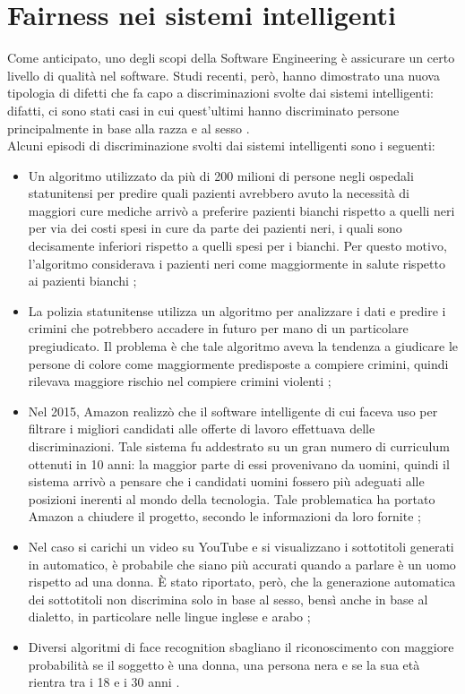 \section{Fairness nei sistemi intelligenti}
Come anticipato, uno degli scopi della Software Engineering è assicurare un certo livello di qualità nel software. Studi recenti, però, hanno dimostrato una nuova tipologia di difetti che fa capo a discriminazioni svolte dai sistemi intelligenti: difatti, ci sono stati casi in cui quest'ultimi hanno discriminato persone principalmente in base alla razza e al sesso \cite{brun2018software}.\\
Alcuni episodi di discriminazione svolti dai sistemi intelligenti sono i seguenti:
\begin{itemize}
  \item Un algoritmo utilizzato da più di 200 milioni di persone negli ospedali statunitensi per predire quali pazienti avrebbero avuto la necessità di maggiori cure mediche arrivò a preferire pazienti bianchi rispetto a quelli neri per via dei costi spesi in cure da parte dei pazienti neri, i quali sono decisamente inferiori rispetto a quelli spesi per i bianchi. Per questo motivo, l'algoritmo considerava i pazienti neri come maggiormente in salute rispetto ai pazienti bianchi \cite{obermeyer2019dissecting};
  \item La polizia statunitense utilizza un algoritmo per analizzare i dati e predire i crimini che potrebbero accadere in futuro per mano di un particolare pregiudicato. Il problema è che tale algoritmo aveva la tendenza a giudicare le persone di colore come maggiormente predisposte a compiere crimini, quindi rilevava maggiore rischio nel compiere crimini violenti \cite{biasblack2016propublica};
  \item Nel 2015, Amazon realizzò che il software intelligente di cui faceva uso per filtrare i migliori candidati alle offerte di lavoro effettuava delle discriminazioni. Tale sistema fu addestrato su un gran numero di curriculum ottenuti in 10 anni: la maggior parte di essi provenivano da uomini, quindi il sistema arrivò a pensare che i candidati uomini fossero più adeguati alle posizioni inerenti al mondo della tecnologia. Tale problematica ha portato Amazon a chiudere il progetto, secondo le informazioni da loro fornite \cite{amazonrecruiting2018reuters};
  \item Nel caso si carichi un video su YouTube e si visualizzano i sottotitoli generati in automatico, è probabile che siano più accurati quando a parlare è un uomo rispetto ad una donna. È stato riportato, però, che la generazione automatica dei sottotitoli non discrimina solo in base al sesso, bensì anche in base al dialetto, in particolare nelle lingue inglese e arabo \cite{tatman-2017-gender};
  \item Diversi algoritmi di face recognition sbagliano il riconoscimento con maggiore probabilità se il soggetto è una donna, una persona nera e se la sua età rientra tra i 18 e i 30 anni \cite{klare2012face}.
\end{itemize}

